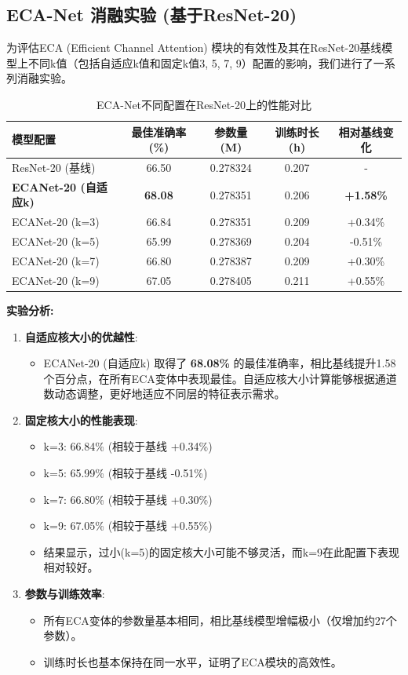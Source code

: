 \documentclass[a4paper]{article}
\begin{document}
\begin{description}
\subsection{ECA-Net 消融实验 (基于ResNet-20)}
为评估ECA (Efficient Channel Attention) 模块的有效性及其在ResNet-20基线模型上不同k值（包括自适应k值和固定k值3, 5, 7, 9）配置的影响，我们进行了一系列消融实验。
\begin{table}[H]
\centering
\caption{ECA-Net不同配置在ResNet-20上的性能对比}
\label{tab:eca_ablation}
\begin{tabular}{lcccc}
\toprule
\textbf{模型配置} & \textbf{最佳准确率 (\%)} & \textbf{参数量 (M)} & \textbf{训练时长 (h)} & \textbf{相对基线变化} \\
\midrule
ResNet-20 (基线) & 66.50 & 0.278324 & 0.207 & - \\
\textbf{ECANet-20 (自适应k)} & \textbf{68.08} & 0.278351 & 0.206 & \textbf{+1.58\%} \\
ECANet-20 (k=3) & 66.84 & 0.278351 & 0.209 & +0.34\% \\
ECANet-20 (k=5) & 65.99 & 0.278369 & 0.204 & -0.51\% \\
ECANet-20 (k=7) & 66.80 & 0.278387 & 0.209 & +0.30\% \\
ECANet-20 (k=9) & 67.05 & 0.278405 & 0.211 & +0.55\% \\
\bottomrule
\end{tabular}
\end{table}

\textbf{实验分析:}
\begin{enumerate}
    \item \textbf{自适应核大小的优越性}:
    \begin{itemize}
        \item ECANet-20 (自适应k) 取得了 \textbf{68.08\%} 的最佳准确率，相比基线提升1.58个百分点，在所有ECA变体中表现最佳。自适应核大小计算能够根据通道数动态调整，更好地适应不同层的特征表示需求。
    \end{itemize}
    \item \textbf{固定核大小的性能表现}:
    \begin{itemize}
        \item k=3: 66.84\% (相较于基线 +0.34\%)
        \item k=5: 65.99\% (相较于基线 -0.51\%)  
        \item k=7: 66.80\% (相较于基线 +0.30\%)
        \item k=9: 67.05\% (相较于基线 +0.55\%)
        \item 结果显示，过小(k=5)的固定核大小可能不够灵活，而k=9在此配置下表现相对较好。
    \end{itemize}
    \item \textbf{参数与训练效率}:
    \begin{itemize}
        \item 所有ECA变体的参数量基本相同，相比基线模型增幅极小（仅增加约27个参数）。
        \item 训练时长也基本保持在同一水平，证明了ECA模块的高效性。
    \end{itemize}
\end{enumerate}


\end{description}
\end{document}
